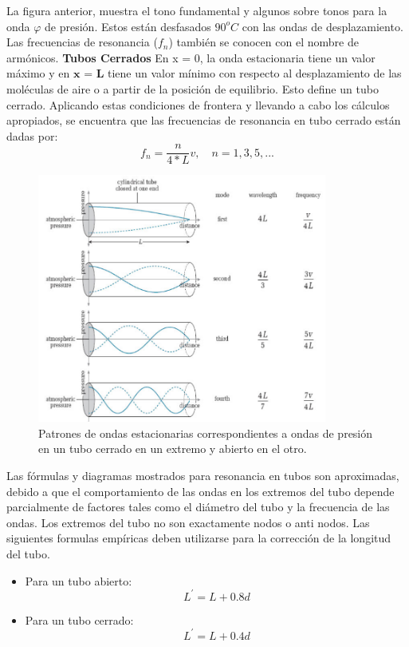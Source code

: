 \documentclass{article}
\begin{document}
La figura anterior, muestra el tono fundamental y algunos sobre tonos para la onda $\varphi $ de presión. Estos están desfasados $90^oC$ con las ondas de desplazamiento. Las frecuencias de resonancia ($f_{n}$) también se conocen con el nombre de armónicos.\newline
\textbf{Tubos Cerrados}\newline
En x = 0, la onda estacionaria tiene un valor máximo y en $\textbf{x = L}$ tiene un valor mínimo con respecto al desplazamiento de las moléculas de aire o a partir de la posición de equilibrio. Esto define un tubo cerrado.
Aplicando estas condiciones de frontera y llevando a cabo los cálculos apropiados, se encuentra que las frecuencias de resonancia en tubo cerrado están dadas por:
\begin{equation}
{ f }_{ n }=\frac { n }{ 4*L } v,\quad n=1,3,5,...
\end{equation}
\begin{figure}[H]
  \centering
     \includegraphics[width=0.85\textwidth]{p2}
  \caption{Patrones de ondas estacionarias correspondientes a ondas de presión en un tubo cerrado en un extremo y abierto en el otro.}
      \label{fig:p2}
\end{figure}
Las fórmulas y diagramas mostrados para resonancia en tubos son aproximadas, debido a que el comportamiento de las ondas en los extremos del tubo depende parcialmente de factores tales como el diámetro del tubo y la frecuencia de las ondas. Los extremos del tubo no son exactamente nodos o anti nodos. Las siguientes formulas empíricas deben utilizarse para la corrección de la longitud del tubo.
\begin{itemize}
\item Para un tubo abierto:
\begin{equation}
L^{'}=L+0.8d
\end{equation}
\item Para un tubo cerrado:
\begin{equation}
L^{'}=L+0.4d
\end{equation}
\end{itemize}
\end{document}
